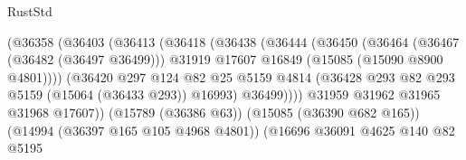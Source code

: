 \begin{lexlean}{RustStd}
\begin{coremodule}
                                          (@36358
                                            (@36403
                                              (@36413
                                                (@36418
                                                  (@36438
                                                    (@36444
                                                      (@36450
                                                        (@36464
                                                          (@36467 (@36482 (@36497 @36499)))
                                                          @31919
                                                          @17607
                                                          @16849
                                                          (@15085 (@15090 @8900 @4801))))
                                                      (@36420
                                                        @297
                                                        @124
                                                        @82
                                                        @25
                                                        @5159
                                                        @4814
                                                        (@36428
                                                          @293
                                                          @82
                                                          @293
                                                          @5159
                                                          (@15064 (@36433 @293))
                                                          @16993)
                                                        @36499))))
                                                @31959
                                                @31962
                                                @31965
                                                @31968
                                                @17607))
                                            (@15789 (@36386 @63))
                                            (@15085 (@36390 @682 @165))
                                            (@14994 (@36397 @165 @105 @4968 @4801))
                                            (@16696
                                              @36091
                                              @4625
                                              @140
                                              @82
                                              @5195

\end{coremodule}
\end{lexlean}
